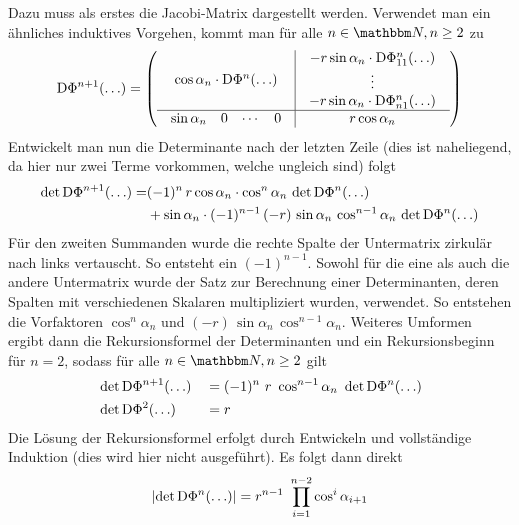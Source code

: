 	Dazu muss als erstes die Jacobi-Matrix dargestellt werden.
	Verwendet man ein ähnliches induktives Vorgehen, kommt man für alle $n\in\SN, n\geq2$ zu
	\[
		\mathrm{D}\Phi^{n+1}(\ldots) = 
		\left(
		\begin{array}{c|c}
			\cos\alpha_n\cdot\mathrm{D}\Phi^n(\ldots) 
			& 
			\begin{array}{c}
				-r\sin\alpha_n\cdot\mathrm{D}\Phi_{11}^n(\ldots) \\
				\vdots \\
				-r\sin\alpha_n\cdot\mathrm{D}\Phi_{n1}^n(\ldots) \\
			\end{array}\\
			\hline
			\begin{array}{rrrr}
				\sin\alpha_n & 0 & \cdots & 0 \\
			\end{array} 
			& 
			r\cos\alpha_n
		\end{array}
		\right)
	\]
	Entwickelt man nun die Determinante nach der letzten Zeile (dies ist naheliegend, da hier nur zwei Terme vorkommen, welche ungleich sind) folgt
	\begin{alignat}{2}
		\det \mathrm{D}\Phi^{n+1}(\ldots) = &(-1)^n\, r \cos\alpha_n \cdot \cos^{n}\alpha_n \, \det\mathrm{D}\Phi^n(\ldots) \nonumber \\
		& + \sin\alpha_n \cdot (-1)^{n-1} \, (-r) \, \sin\alpha_n \, \cos^{n-1}\alpha_n \, \det\mathrm{D}\Phi^n(\ldots) \nonumber
	\end{alignat}
	Für den zweiten Summanden wurde die rechte Spalte der Untermatrix zirkulär nach links vertauscht.
	So entsteht ein $(-1)^{n-1}$.
	Sowohl für die eine als auch die andere Untermatrix wurde der Satz zur Berechnung einer Determinanten, deren Spalten mit verschiedenen Skalaren multipliziert wurden, verwendet.
	So entstehen die Vorfaktoren $\cos^{n}\alpha_n$ und $(-r)\,\sin\alpha_n \, \cos^{n-1}\alpha_n$.
	Weiteres Umformen ergibt dann die Rekursionsformel der Determinanten und ein Rekursionsbeginn für $n = 2$, sodass für alle $n\in\SN, n\geq2$ gilt
	\begin{alignat}{2}
		&\det \Diff\Phi^{n+1}(\ldots) &&= (-1)^n \ r \ \cos^{n-1}\alpha_n \ \det\Diff\Phi^n(\ldots) \nonumber \\
		&\det \Diff\Phi^{2}(\ldots) &&= r \nonumber
	\end{alignat}
	Die Lösung der Rekursionsformel erfolgt durch Entwickeln und vollständige Induktion (dies wird hier nicht ausgeführt).
	Es folgt dann direkt
	\[
		\left\vert  \det\mathrm{D}\Phi^{n}(\ldots)  \right\vert = r^{n-1} \ \prod_{i=1}^{n-2} \cos^i\alpha_{i+1}
	\]
